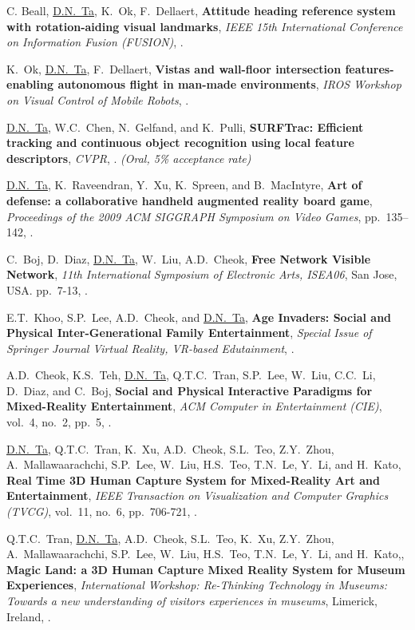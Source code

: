 \documentclass[letterpaper,MMMyyyy,nonstopmode]{simpleresumecv}
\begin{document}
\begin{Body}
\Gap
\NumberedItem{[11]}
{ C. Beall, \underline{D.N.~Ta}, K.~Ok, F.~Dellaert,
\textbf{Attitude heading reference system with rotation-aiding visual landmarks},
\textit{IEEE 15th International Conference on Information Fusion (FUSION)},
.}


\Gap
\NumberedItem{[10]}
{ K.~Ok, \underline{D.N.~Ta}, F.~Dellaert,
\textbf{Vistas and wall-floor intersection features-enabling autonomous flight in man-made environments},
\textit{IROS Workshop on Visual Control of Mobile Robots},
.}


\Gap
\NumberedItem{[9]}
{ \underline{D.N.~Ta}, W.C.~Chen, N.~Gelfand, and K.~Pulli,
\textbf{SURFTrac: Efficient tracking and continuous object recognition using local feature descriptors},
\textit{CVPR},
. \textit{(Oral, 5\% acceptance rate)}}

\Gap
\NumberedItem{[8]}
{ \underline{D.N.~Ta}, K.~Raveendran, Y.~Xu, K.~Spreen, and B.~MacIntyre,
\textbf{Art of defense: a collaborative handheld augmented reality board game},
\textit{Proceedings of the 2009 ACM SIGGRAPH Symposium on Video Games},
pp.~135–142,
.}

\Gap
\NumberedItem{[7]}
{  C.~Boj, D.~Diaz, \underline{D.N.~Ta}, W.~Liu, A.D.~Cheok,
\textbf{Free Network Visible Network},
\textit{11th International Symposium of Electronic Arts, ISEA06},
San Jose, USA.
pp.~7-13,
.}


\Gap
\NumberedItem{[6]}
{E.T.~Khoo, S.P.~Lee, A.D.~Cheok, and \underline{D.N.~Ta},
\textbf{Age Invaders: Social and Physical Inter-Generational Family Entertainment},
\textit{Special Issue of Springer Journal Virtual Reality, VR-based Edutainment},
.}


\Gap
\NumberedItem{[5]}
{A.D.~Cheok, K.S.~Teh, \underline{D.N.~Ta}, Q.T.C.~Tran, S.P.~Lee, W.~Liu, C.C.~Li, D.~Diaz, and C.~Boj,
\textbf{Social and Physical Interactive Paradigms for Mixed-Reality Entertainment},
\textit{ACM Computer in Entertainment (CIE)},
vol.~4,
no.~2,
pp.~5,
.}

\Gap
\NumberedItem{[4]}
{\underline{D.N.~Ta},  Q.T.C.~Tran, K.~Xu, A.D.~Cheok, S.L.~Teo, Z.Y.~Zhou, A.~Mallawaarachchi, S.P.~Lee, W.~Liu, H.S.~Teo, T.N.~Le, Y.~Li, and H.~Kato,
\textbf{Real Time 3D Human Capture System for Mixed-Reality Art and Entertainment},
\textit{IEEE Transaction on Visualization and Computer Graphics (TVCG)},
vol.~11,
no.~6,
pp.~706-721,
.}

\Gap
\NumberedItem{[3]}
{ Q.T.C.~Tran, \underline{D.N.~Ta},  A.D.~Cheok, S.L.~Teo, K.~Xu, Z.Y.~Zhou, A.~Mallawaarachchi, S.P.~Lee, W.~Liu, H.S.~Teo, T.N.~Le, Y.~Li, and H.~Kato,,
\textbf{Magic Land: a 3D Human Capture Mixed Reality System for Museum Experiences},
\textit{International Workshop: Re-Thinking Technology in Museums: Towards a new understanding of visitors experiences in museums},
Limerick, Ireland,
.}


\end{Body}
\end{document}
